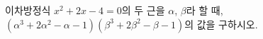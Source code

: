 이차방정식 $x^2+2x-4=0$의 두 근을 $\alpha$, $\beta$라 할 때, $(\alpha^3+2\alpha^2-\alpha-1)(\beta^3+2\beta^2-\beta-1)$의 값을 구하시오.
